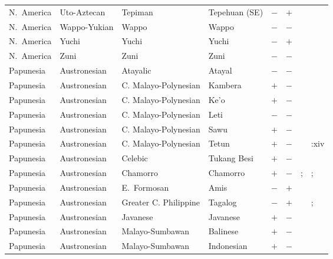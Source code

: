 \begin{landscape}
\begin{longtable}{l>{\raggedright\arraybackslash}p{2.2cm}>{\raggedright}p{2.5cm}>{\raggedright\arraybackslash}p{2.5cm}cc>{\raggedright\arraybackslash}p{3.4cm}>{\raggedright\arraybackslash}p{3.4cm}}
N.~America & Uto-Aztecan & Tepiman & Tepehuan (SE) & $-$ & $+$ & \citealt{Gil2013} & \citealt[83--84]{Willett1991}\\
N.~America & Wappo-Yukian & Wappo & Wappo & $-$ & $-$ & \citealt{Gil2013} & \citealt[299]{Nichols1992}\\
N.~America & Yuchi & Yuchi & Yuchi & $-$ & $+$ & \citealt{Gil2013} & \citealt[301]{Nichols1992}\\
N.~America & Zuni & Zuni & Zuni & $-$ & $-$ & \citealt{Gil2013} & \citealt{Corbett2013}\\
Papunesia & Austronesian & Atayalic & Atayal & $-$ & $-$ & \citealt{Gil2013} & \citealt[passim]{Rau1992}\\
Papunesia & Austronesian & C. Malayo-Polynesian & Kambera & $+$ & $-$ & \citealt{Gil2013} & \citealt{Corbett2013}\\
Papunesia & Austronesian & C. Malayo-Polynesian & Ke'o & $+$ & $-$ & \citealt{Gil2013} & \citealt[passim]{Baird2002}\\
Papunesia & Austronesian & C. Malayo-Polynesian & Leti & $-$ & $-$ & \citealt{Gil2013} & \citealt[passim]{Engelenhoven2005}\\
Papunesia & Austronesian & C. Malayo-Polynesian & Sawu & $+$ & $-$ & \citealt{Gil2013} & \citealt{Corbett2013}\\
Papunesia & Austronesian & C. Malayo-Polynesian & Tetun & $+$ & $-$ & \citealt{Gil2013} & \citealt{Morris1984}:xiv\\
Papunesia & Austronesian & Celebic & Tukang Besi & $+$ & $-$ & \citealt{Gil2013} & \citealt{Corbett2013}\\
Papunesia & Austronesian & Chamorro & Chamorro & $+$ & $-$ & \citealt[137, 299]{Nichols1992}; \citealt[164--166]{Topping1973} & \citealt[passim]{Topping1973}; \citealt[299]{Nichols1992}\\
Papunesia & Austronesian & E.~Formosan & Amis & $-$ & $+$ & \citealt{Gil2013} & \citealt[79]{Wu2006}\\
Papunesia & Austronesian & Greater C. Philippine & Tagalog & $-$ & $+$ & \citealt{Gil2013} & \citealt{Corbett2013}; \citealt[197--198]{Schachter1972}\\
Papunesia & Austronesian & Javanese & Javanese & $+$ & $-$ & \citealt{Gil2013} & \citealt[passim]{Oakes2009}\\
Papunesia & Austronesian & Malayo-Sumbawan & Balinese & $+$ & $-$ & \citealt{Gil2013} & \citealt[passim]{Artawa2013}\\
Papunesia & Austronesian & Malayo-Sumbawan & Indonesian & $+$ & $-$ & \citealt{Gil2013} & \citealt{Corbett2013}\\

\end{longtable}
\end{landscape}
